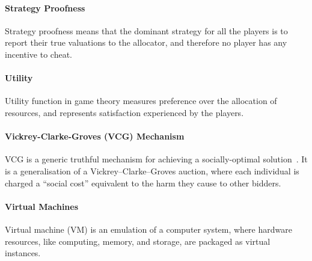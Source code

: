 \paragraph{Strategy Proofness}
Strategy proofness means that the dominant strategy for all the players is to 
report their true valuations to the allocator, 
and therefore no player has any incentive to cheat.

\paragraph{Utility}
Utility function in game theory measures preference over the allocation of resources, 
and represents satisfaction experienced by the players.

\paragraph{Vickrey-Clarke-Groves (VCG) Mechanism} VCG is a generic truthful mechanism for achieving a socially-optimal solution~\cite{Nisan2001}.
It is a generalisation of a Vickrey–Clarke–Groves auction, 
where each individual is charged a \enquote{social cost} equivalent to the harm they cause to other bidders.

\paragraph{Virtual Machines}
Virtual machine (VM) is an emulation of a computer system, 
where hardware resources, like computing, memory, and storage, are packaged as virtual instances.

